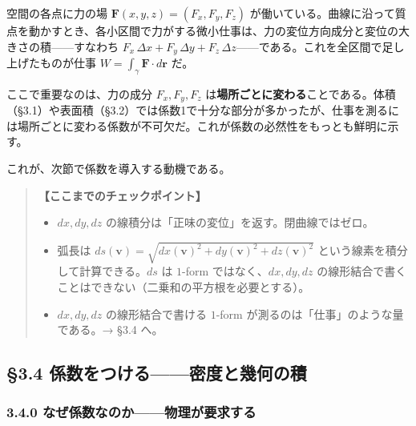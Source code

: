 \documentclass[a4paper,12pt,openany]{book}
\begin{document}
空間の各点に力の場 \(\mathbf{F}(x,y,z) = (F_x, F_y, F_z)\)
が働いている。曲線に沿って質点を動かすとき、各小区間で力がする微小仕事は、力の変位方向成分と変位の大きさの積——すなわち
\(F_x\,\Delta x + F_y\,\Delta y + F_z\,\Delta z\)——である。これを全区間で足し上げたものが仕事
\(W = \int_\gamma \mathbf{F}\cdot d\mathbf{r}\) だ。

ここで重要なのは、力の成分 \(F_x, F_y, F_z\)
は\textbf{場所ごとに変わる}ことである。体積（§3.1）や表面積（§3.2）では係数1で十分な部分が多かったが、仕事を測るには場所ごとに変わる係数が不可欠だ。これが係数の必然性をもっとも鮮明に示す。

これが、次節で係数を導入する動機である。

\begin{quote}
\textbf{【ここまでのチェックポイント】}

\begin{itemize}
\item
  \(dx, dy, dz\) の線積分は「正味の変位」を返す。閉曲線ではゼロ。
\item
  弧長は
  \(ds(\mathbf{v}) = \sqrt{dx(\mathbf{v})^2 + dy(\mathbf{v})^2 + dz(\mathbf{v})^2}\)
  という線素を積分して計算できる。\(ds\) は \(1\)-form
  ではなく、\(dx, dy, dz\)
  の線形結合で書くことはできない（二乗和の平方根を必要とする）。
\item
  \(dx, dy, dz\) の線形結合で書ける \(1\)-form
  が測るのは「仕事」のような量である。→ §3.4 へ。
\end{itemize}
\end{quote}

\par\vspace{0.35em}\par

\hypertarget{ux4fc2ux6570ux3092ux3064ux3051ux308bux5bc6ux5ea6ux3068ux5e7eux4f55ux306eux7a4d}{%
\subsection{§3.4
係数をつける——密度と幾何の積}\label{ux4fc2ux6570ux3092ux3064ux3051ux308bux5bc6ux5ea6ux3068ux5e7eux4f55ux306eux7a4d}}

\hypertarget{ux306aux305cux4fc2ux6570ux306aux306eux304bux7269ux7406ux304cux8981ux6c42ux3059ux308b}{%
\subsubsection{3.4.0
なぜ係数なのか——物理が要求する}\label{ux306aux305cux4fc2ux6570ux306aux306eux304bux7269ux7406ux304cux8981ux6c42ux3059ux308b}}
\end{document}
